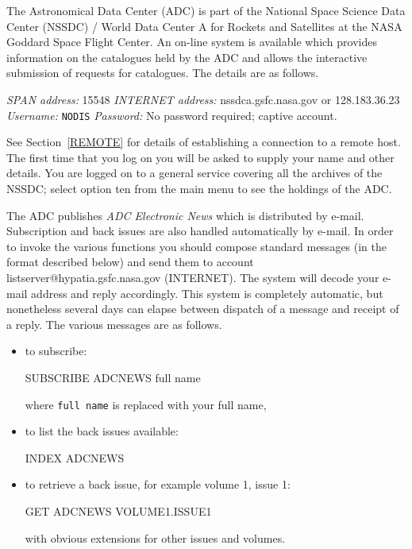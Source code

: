 \documentclass[twoside,11pt,nolof]{starlink}
\begin{document}
The Astronomical Data Center (ADC) is part of the National Space
Science Data Center (NSSDC) / World Data Center A for Rockets and
Satellites at the NASA Goddard Space Flight Center. An on-line system
is available which provides information on the catalogues held by the
ADC and allows the interactive submission of requests for catalogues.
The details are as follows.

\textit{SPAN address: } 15548
\newline \textit{INTERNET address:} nssdca.gsfc.nasa.gov or 128.183.36.23
\newline \textit{Username:} \verb-NODIS-
\newline \textit{Password:} No password required; captive account.

See Section~\ref{REMOTE} for details of establishing a connection to
a remote host. The first time that you log on you will
be asked to supply your name and other details. You are logged on to a
general service covering all the archives of the NSSDC; select option
ten from the main menu to see the holdings of the ADC.

The ADC publishes \textit{ADC Electronic News} which is distributed by
e-mail. Subscription and back issues are also handled automatically by
e-mail. In order to invoke the various functions you should compose
standard messages (in the format described below) and send them to
account listserver@hypatia.gsfc.nasa.gov (INTERNET). The system will
decode your e-mail address and reply accordingly. This system is
completely automatic, but nonetheless several days can elapse between
dispatch of a message and receipt of a reply. The various messages are
as follows.

\begin{itemize}

  \item to subscribe:
  \begin{terminalv}
    SUBSCRIBE ADCNEWS full name
  \end{terminalv}

   where \verb-full name- is replaced with your full name,

  \item to list the back issues available:
  \begin{terminalv}
    INDEX ADCNEWS
  \end{terminalv}

  \item to retrieve a back issue, for example volume 1, issue 1:
  \begin{terminalv}
    GET ADCNEWS VOLUME1.ISSUE1
  \end{terminalv}

   with obvious extensions for other issues and volumes.

\end{itemize}
\end{document}
